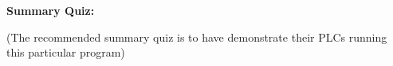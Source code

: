 \vfil \eject

\noindent
{\bf Summary Quiz:}

(The recommended summary quiz is to have  demonstrate their PLCs running this particular program)




